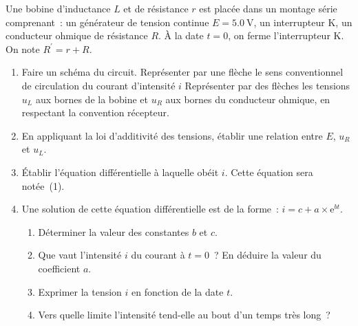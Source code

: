 Une bobine d'inductance $L$ et de résistance $r$ est placée dans un montage
série comprenant~: un générateur de tension continue $E=\qty{5.0}{\V}$, un
interrupteur $\mathrm{K}$, un conducteur ohmique de résistance $R$. À la date
$t=0$, on ferme l'interrupteur $\mathrm{K}$. On note $R^{\prime}=r+R$.

\begin{enumerate}
    \item Faire un schéma du circuit. Représenter par une flèche le sens
          conventionnel de circulation du courant d'intensité $i$ Représenter
          par des flèches les tensions $u_{L}$ aux bornes de la bobine et
          $u_{R}$ aux bornes du conducteur ohmique, en respectant la convention
          récepteur.
    \item En appliquant la loi d'additivité des tensions, établir une relation
          entre $E$, $u_{R}$ et $u_{L}$.
    \item Établir l'équation différentielle à laquelle obéit $i$. Cette équation
          sera notée~(1).
    \item Une solution de cette équation différentielle est de la forme~:
          $i=c+a\times\mathrm{e}^{bt}$.
          \begin{enumerate}
              \item Déterminer la valeur des constantes $b$ et $c$.
              \item Que vaut l'intensité $i$ du courant à $t=0$~? En déduire la
                    valeur du coefficient $a$.
              \item Exprimer la tension $i$ en fonction de la date $t$.
              \item Vers quelle limite l'intensité tend-elle au bout d'un temps
                    très long~?
          \end{enumerate}
\end{enumerate}


